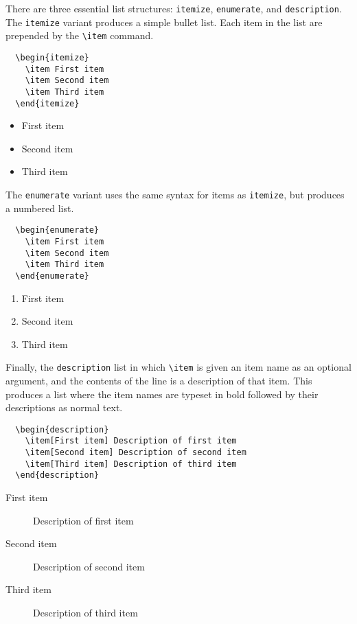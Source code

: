 There are three essential list structures: \texttt{itemize}, \texttt{enumerate}, and \texttt{description}.
The \texttt{itemize} variant produces a simple bullet list.
Each item in the list are prepended by the \verb!\item! command.
%
\begin{verbatim}
  \begin{itemize}
    \item First item
    \item Second item
    \item Third item
  \end{itemize}
\end{verbatim}
%
\begin{itemize}
\item First item
\item Second item
\item Third item
\end{itemize}
%
The \texttt{enumerate} variant uses the same syntax for items as \texttt{itemize}, but produces a numbered list.
%
\begin{verbatim}
  \begin{enumerate}
    \item First item
    \item Second item
    \item Third item
  \end{enumerate}
\end{verbatim}
%
\begin{enumerate}
\item First item
\item Second item
\item Third item
\end{enumerate}
%
Finally, the \texttt{description} list in which \verb!\item! is given an item name as an optional argument, and the contents of the line is a description of that item.
This produces a list where the item names are typeset in bold followed by their descriptions as normal text.
%
\begin{verbatim}
  \begin{description}
    \item[First item] Description of first item
    \item[Second item] Description of second item
    \item[Third item] Description of third item
  \end{description}
\end{verbatim}
%
\begin{description}
\item[First item] Description of first item
\item[Second item] Description of second item
\item[Third item] Description of third item
\end{description}



